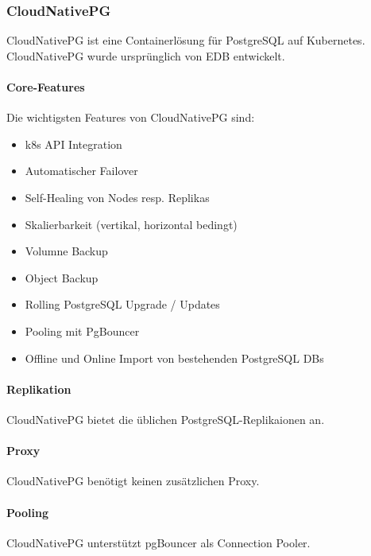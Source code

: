 
\begin{flushleft}
    \subsubsection{CloudNativePG}
    CloudNativePG ist eine Containerlösung für PostgreSQL auf Kubernetes.\\
    CloudNativePG wurde ursprünglich von EDB entwickelt.
\end{flushleft}
\begin{flushleft}
    \paragraph{Core-Features}
    Die wichtigsten Features von CloudNativePG sind\cite{5ALQPE2U}:
    \begin{itemize}
        \item k8s API Integration
        \item Automatischer Failover
        \item Self-Healing von Nodes resp. Replikas
        \item Skalierbarkeit (vertikal, horizontal bedingt)
        \item Volumne Backup
        \item Object Backup
        \item Rolling PostgreSQL Upgrade / Updates
        \item Pooling mit PgBouncer
        \item Offline und Online Import von bestehenden \Gls{PostgreSQL} DBs
    \end{itemize}
\end{flushleft}
\begin{flushleft}
    \paragraph{Replikation}
    CloudNativePG bietet die üblichen PostgreSQL-Replikaionen an.
\end{flushleft}
\begin{flushleft}
    \paragraph{Proxy}
    CloudNativePG benötigt keinen zusätzlichen Proxy.
\end{flushleft}
\begin{flushleft}
    \paragraph{Pooling}
    CloudNativePG unterstützt pgBouncer als \Gls{Connection Pooler}.
\end{flushleft}
